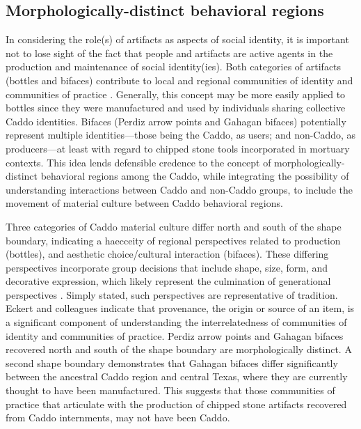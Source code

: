\documentclass[smallextended]{svjour3}       %
\begin{document}
\hypertarget{morphologically-distinct-behavioral-regions}{%
\subsection{Morphologically-distinct behavioral
regions}\label{morphologically-distinct-behavioral-regions}}

In considering the role(s) of artifacts as aspects of social identity,
it is important not to lose sight of the fact that people and artifacts
are active agents in the production and maintenance of social
identity(ies). Both categories of artifacts (bottles and bifaces)
contribute to local and regional communities of identity and communities
of practice \cite{RN8061}. Generally, this concept may be more easily
applied to bottles since they were manufactured and used by individuals
sharing collective Caddo identities. Bifaces (Perdiz arrow points and
Gahagan bifaces) potentially represent multiple identities---those being
the Caddo, as users; and non-Caddo, as producers---at least with regard
to chipped stone tools incorporated in mortuary contexts. This idea
lends defensible credence to the concept of morphologically-distinct
behavioral regions among the Caddo, while integrating the possibility of
understanding interactions between Caddo and non-Caddo groups, to
include the movement of material culture between Caddo behavioral
regions.

Three categories of Caddo material culture differ north and south of the
shape boundary, indicating a haecceity of regional perspectives related
to production (bottles), and aesthetic choice/cultural interaction
(bifaces). These differing perspectives incorporate group decisions that
include shape, size, form, and decorative expression, which likely
represent the culmination of generational perspectives \cite{RN5610}.
Simply stated, such perspectives are representative of tradition. Eckert
and colleagues \cite{RN8061} indicate that provenance, the origin or
source of an item, is a significant component of understanding the
interrelatedness of communities of identity and communities of practice.
Perdiz arrow points and Gahagan bifaces recovered north and south of the
shape boundary are morphologically distinct. A second shape boundary
demonstrates that Gahagan bifaces differ significantly between the
ancestral Caddo region and central Texas, where they are currently
thought to have been manufactured. This suggests that those communities
of practice that articulate with the production of chipped stone
artifacts recovered from Caddo internments, may not have been Caddo.
\end{document}
